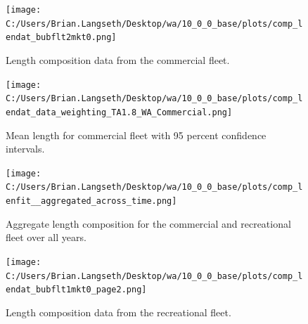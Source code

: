 \documentclass[11pt,
  english,
  a4paper,
]{article}
\begin{document}
\tagmcend\tagstructend


\begin{figure}
\centering
\texttt{[image: C:/Users/Brian.Langseth/Desktop/wa/10\_0\_0\_base/plots/comp\_lendat\_bubflt2mkt0.png]}
\caption{Length composition data from the commercial fleet.\label{fig:com-len-data}}
\end{figure}

\tagmcend\tagstructend


\begin{figure}
\centering
\texttt{[image: C:/Users/Brian.Langseth/Desktop/wa/10\_0\_0\_base/plots/comp\_lendat\_data\_weighting\_TA1.8\_WA\_Commercial.png]}
\caption{Mean length for commercial fleet with 95 percent confidence intervals.\label{fig:mean-com-len-data}}
\end{figure}

\tagmcend\tagstructend


\begin{figure}
\centering
\texttt{[image: C:/Users/Brian.Langseth/Desktop/wa/10\_0\_0\_base/plots/comp\_lenfit\_\_aggregated\_across\_time.png]}
\caption{Aggregate length composition for the commercial and recreational fleet over all years.\label{fig:wa-len-agg}}
\end{figure}

\tagmcend\tagstructend


\begin{figure}
\centering
\texttt{[image: C:/Users/Brian.Langseth/Desktop/wa/10\_0\_0\_base/plots/comp\_lendat\_bubflt1mkt0\_page2.png]}
\caption{Length composition data from the recreational fleet.\label{fig:rec-len-data}}
\end{figure}

\tagmcend\tagstructend

\end{document}
